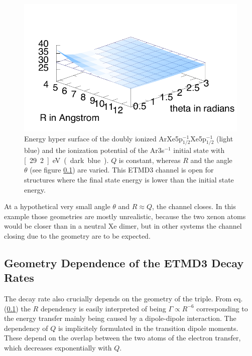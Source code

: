 \begin{figure}[htb]
 \centering
 \includegraphics[scale=0.8]{pics/ArXeXe12_12_surf.pdf}
 \caption{Energy hyper surface of the doubly ionized
          ArXe5p$_{1/2}^{-1}$Xe5p$_{1/2}^{-1}$ (light blue) and the ionization
          potential of the Ar3s$^{-1}$ initial state with \unit[29.2]{eV}
          (dark blue). $Q$ is constant, whereas $R$ and the angle $\theta$
          (see figure \ref{}) are varied. This ETMD3 channel is open for
          structures where
          the final state energy is lower than the initial state energy.}
 \label{figure:ArXe2_geom_energy}
\end{figure}

At a hypothetical very small angle $\theta$ and $R\approx Q$, the channel closes.
In this example those geometries are mostly unrealistic, because the two xenon
atoms would be closer than in a neutral Xe dimer, but in other systems the
channel closing due to the geometry are to be expected.


\subsection{Geometry Dependence of the ETMD3 Decay Rates}
The decay rate also crucially depends on the geometry of the triple.
From eq. (\ref{}) the $R$ dependency is easily interpreted of being
$\Gamma \propto R^{-6}$ corresponding to the energy transfer mainly being
caused by a dipole-dipole interaction. The dependency of $Q$ is implicitely
formulated in the transition dipole moments. These depend on the overlap
between the two atoms of the electron transfer, which decreases exponentially
with $Q$.



